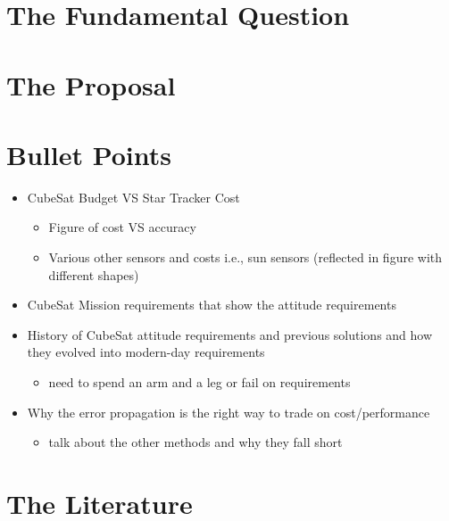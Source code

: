 \chapter{The Fundamental Question}


\chapter{The Proposal}


\chapter{Bullet Points}
\begin{itemize}
    \item CubeSat Budget VS Star Tracker Cost \cite{SmallSatMarket}
    \begin{itemize}
        \item Figure of cost VS accuracy 
        \item Various other sensors and costs i.e., sun sensors (reflected in figure with different shapes)
    \end{itemize} 
    \item CubeSat Mission requirements that show the attitude requirements \cite{CubeSatCLICK, OnOrbitBeamCalibration} 
    \item History of CubeSat attitude requirements and previous solutions and how they evolved into modern-day requirements
    \begin{itemize}
    \item need to spend an arm and a leg or fail on requirements 
    \end{itemize}
        \item Why the error propagation is the right way to trade on cost/performance 
    \begin{itemize}
        \item talk about the other methods and why they fall short  
    \end{itemize}
\end{itemize}

\chapter{The Literature}


